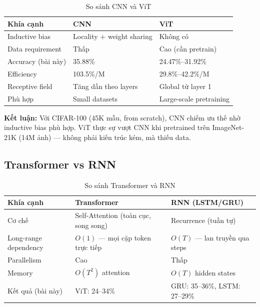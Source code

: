 \documentclass[12pt, a4paper]{article}
\begin{document}
\begin{table}[H]
\centering
\caption{So sánh CNN và ViT}
\begin{tabular}{lll}
\toprule
\textbf{Khía cạnh} & \textbf{CNN} & \textbf{ViT} \\
\midrule
Inductive bias     & Locality + weight sharing  & Không có \\
Data requirement   & Thấp                       & Cao (cần pretrain) \\
Accuracy (bài này) & 35.88\%                    & 24.47\%--31.92\% \\
Efficiency         & 103.5\%/M                  & 29.8\%--42.2\%/M \\
Receptive field    & Tăng dần theo layers       & Global từ layer 1 \\
Phù hợp            & Small datasets             & Large-scale pretraining \\
\bottomrule
\end{tabular}
\end{table}

\textbf{Kết luận:} Với CIFAR-100 (45K mẫu, from scratch), CNN chiếm ưu thế nhờ inductive bias phù hợp. ViT thực sự vượt CNN khi pretrained trên ImageNet-21K (14M ảnh) --- không phải kiến trúc kém, mà thiếu data.

\subsection{Transformer vs RNN}

\begin{table}[H]
\centering
\caption{So sánh Transformer và RNN}
\begin{tabular}{lll}
\toprule
\textbf{Khía cạnh} & \textbf{Transformer} & \textbf{RNN (LSTM/GRU)} \\
\midrule
Cơ chế             & Self-Attention (toàn cục, song song) & Recurrence (tuần tự) \\
Long-range dependency & $O(1)$ --- mọi cặp token trực tiếp & $O(T)$ --- lan truyền qua steps \\
Parallelism        & Cao                   & Thấp \\
Memory             & $O(T^2)$ attention    & $O(T)$ hidden states \\
Kết quả (bài này)  & ViT: 24--34\%         & GRU: 35--36\%, LSTM: 27--29\% \\
\bottomrule
\end{tabular}
\end{table}
\end{document}
